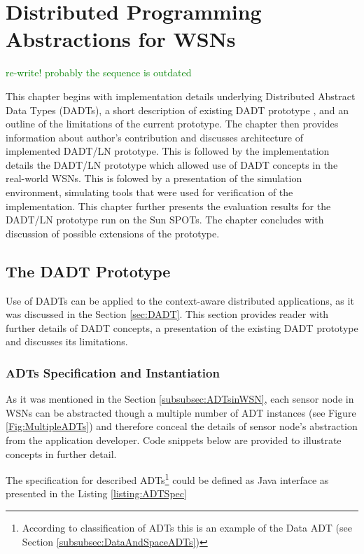 \chapter{Distributed Programming Abstractions for WSNs}
\label{chap:Implementation}


\textcolor{green}{re-write! probably the sequence is outdated}

This chapter begins with implementation details underlying Distributed Abstract
Data Types (DADTs), a short description of existing DADT prototype
\cite{migliavacca_DADT:2006}, and an outline of the limitations of the current
prototype. The chapter then provides information about author's contribution and
discusses architecture of implemented DADT/LN prototype. This is followed by the
implementation details the DADT/LN prototype which allowed use of DADT concepts
in the real-world WSNs. This is folowed by a presentation of the simulation
environment, simulating tools that were used for verification of the
implementation. This chapter further presents the evaluation results for the
DADT/LN prototype run on the Sun SPOTs. The chapter concludes with discussion
of possible extensions of the prototype.

\section {The DADT Prototype}

Use of DADTs can be applied to the context-aware distributed applications, as
it was discussed in the Section \ref{sec:DADT}. This section provides reader with
further details of DADT concepts, a presentation of the existing DADT
prototype \cite{migliavacca_DADT:2006} and discusses its limitations.

\subsection{ADTs Specification and Instantiation} \label{subsec:ADTSpecInst}

As it was mentioned in the Section \ref{subsubsec:ADTsinWSN}, each sensor node
in WSNs can be abstracted though a multiple number of ADT instances (see
Figure \ref{Fig:MultipleADTs}) and therefore conceal the details of sensor
node's abstraction from the application developer. Code snippets below are
provided to illustrate concepts in further detail.

The specification for described ADTs\footnote{According to classification of
ADTs this is an example of the Data ADT (see Section
\ref{subsubsec:DataAndSpaceADTs})} could be defined as Java interface as presented in the Listing \ref{listing:ADTSpec}

